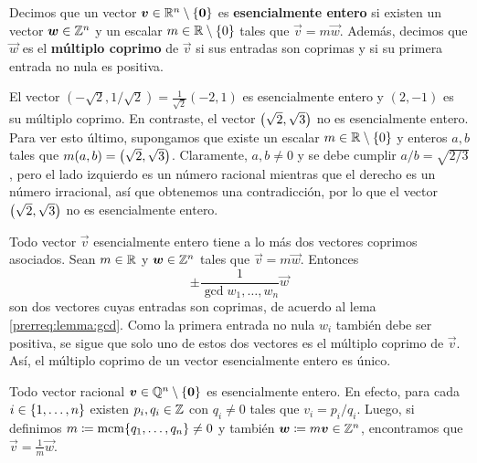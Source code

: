 \begin{definition}
	\label{theory:def:rational}
	Decimos que un vector $\boldsymbol{v} \in \mathbb{R}^n \setminus \lbrace \boldsymbol{0} \rbrace$ es
	\textbf{esencialmente entero} si existen un vector $\boldsymbol{w} \in \mathbb{Z}^n$ y un escalar $m \in \mathbb{R}
	\setminus \lbrace 0 \rbrace$ tales que $\vec{v} = m\vec{w}$. Además, decimos que $\vec{w}$ es el
	\textbf{múltiplo coprimo} de $\vec{v}$ si sus entradas son coprimas y si su primera entrada no
	nula es positiva.
\end{definition}
\begin{example}
	El vector $\left(-\sqrt{2}, 1/\sqrt{2}\right) = \frac{1}{\sqrt{2}}(-2, 1)$ es esencialmente entero
	y $(2, -1)$ es su múltiplo coprimo. En contraste, el vector $\left( \sqrt{2}, \sqrt{3} \right)$ no es
	esencialmente entero. Para ver esto último, supongamos que existe un escalar $m \in
	\mathbb{R}\setminus\lbrace 0 \rbrace$ y enteros $a, b$ tales que $m(a, b) = \left( \sqrt{2}, \sqrt{3} \right)$.
	Claramente, $a, b \neq 0$ y se debe cumplir $a/b = \sqrt{2/3}$, pero el lado izquierdo es un
	número racional mientras que el derecho es un número irracional, así que obtenemos una
	contradicción, por lo que el vector $\left( \sqrt{2}, \sqrt{3} \right)$ no es esencialmente entero.
\end{example}
\begin{observation}
	\label{obs:coprime-unique}
	Todo vector $\vec{v}$ esencialmente entero tiene a lo más dos vectores coprimos asociados. Sean
	$m \in \mathbb{R}$ y $\boldsymbol{w} \in \mathbb{Z}^n$ tales que $\vec{v} = m\vec{w}$. Entonces
	\begin{equation*}
		\pm \frac{1}{\gcd{w_1, \ldots, w_n}}\vec{w}
	\end{equation*}
	son dos vectores cuyas entradas son coprimas, de acuerdo al lema \ref{prerreq:lemma:gcd}. Como
	la primera entrada no nula $w_i$ también debe ser positiva, se sigue que solo uno de estos dos
	vectores es el múltiplo coprimo de $\vec{v}$. Así, el múltiplo coprimo de un vector
	esencialmente entero es único.
\end{observation}
\begin{observation}
	Todo vector racional $\boldsymbol{v} \in \mathbb{Q}^n \setminus \lbrace \boldsymbol{0} \rbrace $  es esencialmente
	entero. En efecto, para cada $i \in \lbrace 1, \ldots, n \rbrace$ existen $p_i, q_i \in
	\mathbb{Z}$ con $q_i \neq 0$ tales que $v_i = p_i/q_i$. Luego, si definimos $m \coloneq \mathop{\mathrm{mcm}{\left\lbrace q_1,
	\ldots, q_n \right\rbrace}} \neq 0$ y también $\boldsymbol{w} \coloneq m\boldsymbol{v} \in \mathbb{Z}^n$, encontramos que $\vec{v} =
	\frac{1}{m}\vec{w}$.
\end{observation}

